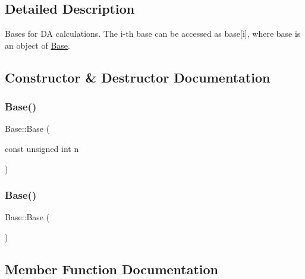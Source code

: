 \subsection{Detailed Description}
Bases for DA calculations. The i-\/th base can be accessed as base\mbox{[}i\mbox{]}, where base is an object of \mbox{\hyperlink{struct_base}{Base}}. 



\subsection{Constructor \& Destructor Documentation}
\mbox{\label{struct_base_afb04e0c2fd50911ddc8f7899ce3a1f4c}} 
\subsubsection{\texorpdfstring{Base()}{Base()}\hspace{0.1cm}{\footnotesize\ttfamily [1/2]}}
{\footnotesize\ttfamily Base\+::\+Base (\begin{DoxyParamCaption}\item[{const unsigned int}]{n }\end{DoxyParamCaption})}

\mbox{\label{struct_base_a5ffe0568374d8b9b4c4ec32953fd6453}} 
\subsubsection{\texorpdfstring{Base()}{Base()}\hspace{0.1cm}{\footnotesize\ttfamily [2/2]}}
{\footnotesize\ttfamily Base\+::\+Base (\begin{DoxyParamCaption}{ }\end{DoxyParamCaption})\hspace{0.3cm}{\ttfamily [inline]}}



\subsection{Member Function Documentation}
\mbox{\label{struct_base_a6955a620bff8ba48f55244eaed48735d}} 
